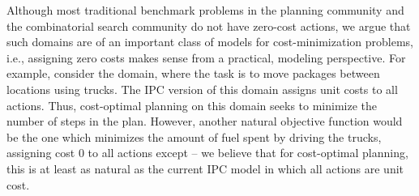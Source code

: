 
Although most traditional benchmark problems in the planning community and the combinatorial search community do not have zero-cost actions,
we argue that such domains are of an important class of models for cost-minimization problems, i.e.,
assigning zero costs makes sense from a practical, modeling perspective.
For example, consider the  domain, where the task is to move packages between locations using trucks.
The IPC version of this domain assigns unit costs to all actions. Thus, cost-optimal planning on this domain seeks to minimize the number of steps in the plan.
However, another natural objective function would be the one which minimizes the amount of fuel spent by driving the trucks,
assigning cost 0 to all actions except  -- we believe that for cost-optimal planning, this is at least as natural as the current IPC model in which all actions are unit cost.


